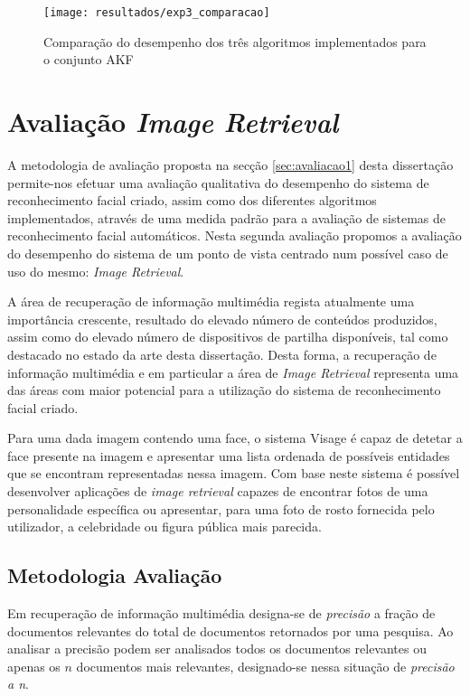 \begin{figure}[ht]
  \begin{center}
    \leavevmode
    \texttt{[image: resultados/exp3\_comparacao]}
    \caption{Comparação do desempenho dos três algoritmos implementados para o conjunto AKF}
    \label{fig:exp3_comaparacao}
  \end{center}
\end{figure}

\section{Avaliação \textit{Image Retrieval}} \label{sec:avaliacao2}
A metodologia de avaliação proposta na secção \ref{sec:avaliacao1} desta dissertação permite-nos efetuar uma avaliação qualitativa do desempenho do sistema de reconhecimento facial criado, assim como dos diferentes algoritmos implementados, através de uma medida padrão para a avaliação de sistemas de reconhecimento facial automáticos. Nesta segunda avaliação propomos a avaliação do desempenho do sistema de um ponto de vista centrado num possível caso de uso do mesmo: \textit{Image Retrieval}.

A área de recuperação de informação multimédia regista atualmente uma importância crescente, resultado do elevado número de conteúdos produzidos, assim como do elevado número de dispositivos de partilha disponíveis, tal como destacado no estado da arte desta dissertação. Desta forma, a recuperação de informação multimédia e em particular a área de \textit{Image Retrieval} representa uma das áreas com maior potencial para a utilização do sistema de reconhecimento facial criado.

Para uma dada imagem contendo uma face, o sistema Visage é capaz de detetar a face presente na imagem e apresentar uma lista ordenada de possíveis entidades que se encontram representadas nessa imagem. Com base neste sistema é possível desenvolver aplicações de \textit{image retrieval} capazes de encontrar fotos de uma personalidade específica ou apresentar, para uma foto de rosto fornecida pelo utilizador, a celebridade ou figura pública mais parecida.

\subsection{Metodologia Avaliação}
Em recuperação de informação multimédia designa-se de \textit{precisão} a fração de documentos relevantes do total de documentos retornados por uma pesquisa. Ao analisar a precisão podem ser analisados todos os documentos relevantes ou apenas os $n$ documentos mais relevantes, designado-se nessa situação de \textit{precisão a n}.

